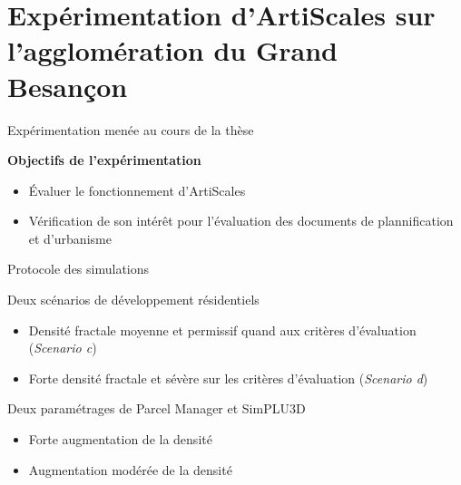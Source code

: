 \documentclass[xcolor=table]{beamer}
\begin{document}
\section[Expérimentation]{Expérimentation d'ArtiScales sur l'agglomération du Grand Besançon}





\begin{frame}{Expérimentation menée au cours de la thèse}
	\begin{block}
		\textbf{Objectifs de l'expérimentation}\\
		\begin{itemize}
			\item Évaluer le fonctionnement d'ArtiScales
			\item Vérification de son intérêt pour l'évaluation des documents de plannification et d'urbanisme
		\end{itemize}
	\end{block}
\end{frame}

\begin{frame}{Protocole des simulations}
	\begin{block}{Deux scénarios de développement résidentiels}
		\begin{itemize}
			\item Densité fractale moyenne et permissif quand aux critères d'évaluation (\textit{Scenario c})
			\item Forte densité fractale et sévère sur les critères d'évaluation (\textit{Scenario d})
		\end{itemize}
	\end{block}
	\begin{block}{Deux paramétrages de Parcel Manager et SimPLU3D}
	\begin{itemize}
		\item Forte augmentation de la densité
		\item Augmentation modérée de la densité
	\end{itemize}
\end{block}
\end{frame}
\end{document}
